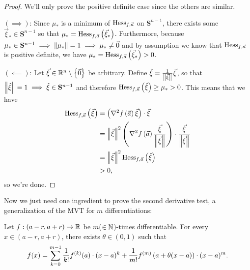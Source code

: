 \documentclass[main.tex]{subfiles}
\begin{document}
\begin{proof}
    We'll only prove the positive definite case since the others are similar.

    $(\implies)$: Since $\mu_*$ is a minimum of $\operatorname{Hess}_{f, \vec{a}}$ on $\mathbf{S}^{n - 1}$, there exists some $\vec\xi_*\in \mathbf{S}^{n - 1}$ so that $\mu_* = \operatorname{Hess}_{f, \vec{a}}\left( \vec\xi_* \right)$. Furthermore, because $\mu_*\in \mathbf{S}^{n - 1}\implies \left\lVert \mu_* \right\rVert = 1\implies \mu_*\neq \vec{0}$ and by assumption we know that $\operatorname{Hess}_{f, \vec{a}}$ is positive definite, we have $\mu_* = \operatorname{Hess}_{f, \vec{a}}\left( \vec\xi_* \right) > 0$.

    $(\impliedby)$: Let $\vec\xi\in \mathbb R^n\setminus\left\{ \vec{0} \right\}$ be arbitrary. Define $\hat{\xi} = \frac{1}{\left\lVert \vec\xi \right\rVert} \vec\xi$, so that $\left\lVert \hat{\xi} \right\rVert = 1\implies \hat{\xi}\in \mathbf{S}^{n - 1}$ and therefore $\operatorname{Hess}_{f, \vec{a}}\left( \hat{\xi} \right) \ge \mu_* > 0$. This means that we have
    \begin{align*}
        \operatorname{Hess}_{f, \vec{a}}\left( \vec\xi \right) &= \left( \nabla^2 f\left( \vec{a} \right)\vec\xi \right) \cdot \vec\xi \\
        &= \left\lVert \vec\xi \right\rVert^2 \left( \nabla^2 f\left( \vec{a} \right)\frac{\vec\xi}{\left\lVert \vec\xi \right\rVert} \right) \cdot \frac{\vec\xi}{\left\lVert \vec\xi \right\rVert} \\
        &= \left\lVert \vec\xi \right\rVert^2 \operatorname{Hess}_{f, \vec{a}}\left( \hat{\xi} \right) \\
        &> 0,
    \end{align*}
    so we're done.
\end{proof}

Now we just need one ingredient to prove the second derivative test, a generalization of the MVT for $m$ differentiations:

\begin{theorem}
    Let $f : (a - r, a + r)\to \mathbb R$ be $m$($\in \mathbb N$)-times differentiable. For every $x\in (a - r, a + r)$, there exists $\theta\in (0, 1)$ such that
    \[f(x) = \sum_{k = 0}^{m - 1} \frac{1}{k!}f^{(k)}(a)\cdot (x - a)^{k} + \frac{1}{m!}f^{(m)}\left( a + \theta(x - a) \right)\cdot (x - a)^m.\]
\end{theorem}
\end{document}
